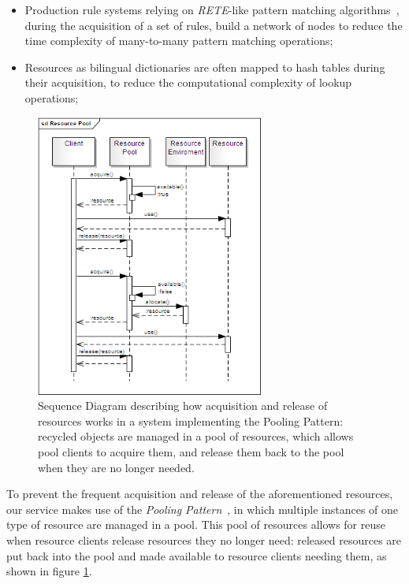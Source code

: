 \documentclass[11pt]{article}
\begin{document}
\begin{itemize}
 \item Production rule systems relying on \emph{RETE}-like pattern matching algorithms~\citep{forgy}, during the acquisition of a set of rules, build a network of nodes to reduce the time complexity of many-to-many pattern matching operations;
 \item Resources as bilingual dictionaries are often mapped to hash tables during their acquisition, to reduce the computational complexity of lookup operations; 
\end{itemize}

\begin{figure}[!ht]
\begin{center}
\includegraphics[width=7.5cm]{resource_pool}
\end{center}
\caption{Sequence Diagram describing how acquisition and release of resources works in a system implementing the Pooling Pattern: recycled objects are managed in a pool of resources, which allows pool clients to acquire them, and release them back to the pool when they are no longer needed.}
\label{fig:rp}
\end{figure}

To prevent the frequent acquisition and release of the aforementioned resources, our service makes use of the \emph{Pooling Pattern}~\citep{kircher2001}, in which multiple instances of one type of resource are managed in a pool.  This pool of resources allows for reuse when resource clients release resources they no longer need: released resources are put back into the pool and made available to resource clients needing them, as shown in figure \ref{fig:rp}.
\end{document}
